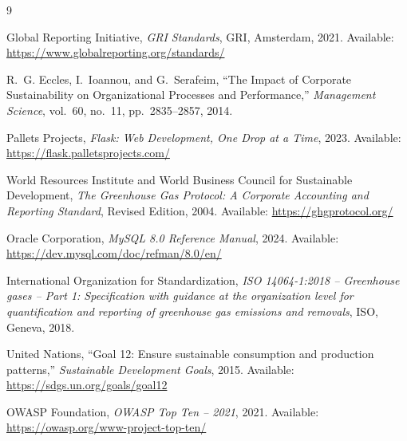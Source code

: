 \documentclass[11pt,a4paper]{article}
\begin{document}
\begin{thebibliography}{9}

Global Reporting Initiative,
\textit{GRI Standards},
GRI, Amsterdam, 2021.
Available: \url{https://www.globalreporting.org/standards/}

R.~G. Eccles, I.~Ioannou, and G.~Serafeim,
``The Impact of Corporate Sustainability on Organizational Processes and Performance,''
\textit{Management Science}, vol.~60, no.~11, pp.~2835--2857, 2014.

Pallets Projects,
\textit{Flask: Web Development, One Drop at a Time},
2023.
Available: \url{https://flask.palletsprojects.com/}

World Resources Institute and World Business Council for Sustainable Development,
\textit{The Greenhouse Gas Protocol: A Corporate Accounting and Reporting Standard},
Revised Edition, 2004.
Available: \url{https://ghgprotocol.org/}

Oracle Corporation,
\textit{MySQL 8.0 Reference Manual},
2024.
Available: \url{https://dev.mysql.com/doc/refman/8.0/en/}

International Organization for Standardization,
\textit{ISO 14064-1:2018 -- Greenhouse gases -- Part 1: Specification with guidance at the organization level for quantification and reporting of greenhouse gas emissions and removals},
ISO, Geneva, 2018.

United Nations,
``Goal 12: Ensure sustainable consumption and production patterns,''
\textit{Sustainable Development Goals},
2015.
Available: \url{https://sdgs.un.org/goals/goal12}

OWASP Foundation,
\textit{OWASP Top Ten -- 2021},
2021.
Available: \url{https://owasp.org/www-project-top-ten/}

\end{thebibliography}
\end{document}
